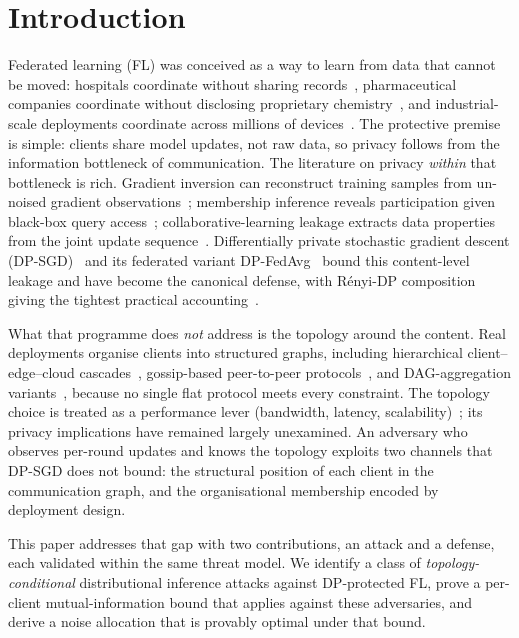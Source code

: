 \section{Introduction}
\label{sec:intro}

Federated learning (FL) was conceived as a way to learn from data that
cannot be moved: hospitals coordinate without sharing
records~\cite{sheller2020medicine,dayan2021covid}, pharmaceutical
companies coordinate without disclosing proprietary chemistry~\cite{melloddy2024},
and industrial-scale deployments coordinate across millions of
devices~\cite{bonawitz2019sysml}. The protective premise is simple:
clients share model updates, not raw data, so privacy follows from the
information bottleneck of communication. The literature on privacy
\emph{within} that bottleneck is rich. Gradient inversion can reconstruct
training samples from un-noised gradient observations~\cite{zhu2019dlg,geiping2020inverting};
membership inference reveals participation given black-box query
access~\cite{shokri2017membership}; collaborative-learning leakage
extracts data properties from the joint update
sequence~\cite{melis2019exploiting}. Differentially private stochastic
gradient descent (DP-SGD)~\cite{abadi2016dpsgd} and its federated variant
DP-FedAvg~\cite{mcmahan2018dpfedavg} bound this content-level leakage and
have become the canonical defense, with R\'enyi-DP composition giving
the tightest practical accounting~\cite{mironov2017rdp}.

What that programme does \emph{not} address is the topology around the
content. Real deployments organise clients into structured graphs, including
hierarchical client--edge--cloud cascades~\cite{liu2020hierarchical,abad2020icassp},
gossip-based peer-to-peer protocols~\cite{roy2019braintorrent,hegedus2021decentralized},
and DAG-aggregation variants~\cite{beilharz2021dag}, because no single
flat protocol meets every constraint. The topology choice is treated
as a performance lever (bandwidth, latency, scalability)~\cite{wang2021fieldguide};
its privacy implications have remained largely unexamined. An adversary
who observes per-round updates and knows the topology exploits two
channels that DP-SGD does not bound: the structural position of each
client in the communication graph, and the organisational membership
encoded by deployment design.

This paper addresses that gap with two contributions, an attack and a
defense, each validated within the same threat model. We identify a
class of \emph{topology-conditional} distributional inference attacks
against DP-protected FL, prove a per-client mutual-information bound
that applies against these adversaries, and derive a noise allocation
that is provably optimal under that bound.

